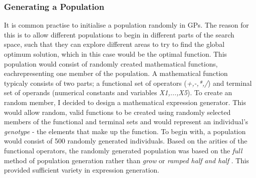 \documentclass[11pt]{article}
\begin{document}
\subsubsection{Generating a Population}\label{subsubsec:genPo}
It is common practise to initialise a population randomly in GPs. The reason for this is to allow different populations to begin in different parts of the search space, such that they can explore different areas to try to find the global optimum solution, which in this case would be the optimal function.  This population would consist of randomly created mathematical functions, eachrepresenting one member of the population. A mathematical function typicaly consists of two parts; a functional set of operators (\textit{+,-,*,/}) and terminal set of operands (numerical constants and variables \textit{X1,...,X5}). To create an random member, I decided to design a mathematical expression generator. This would allow random, valid functions to be created using randomly selected members of the functional and terminal sets and would represent an individual's \textit{genotype} - the elements that make up the function. To begin with, a population would consist of 500 randomly generated individuals. Based on the arities of the functional operators, the randomly generated population was based on the \textit{full} method of population generation \cite{?}  %
rather than \textit{grow} or \textit{ramped half and half} \cite{?}.%
 This provided sufficient variety in expression generation.
\end{document}
